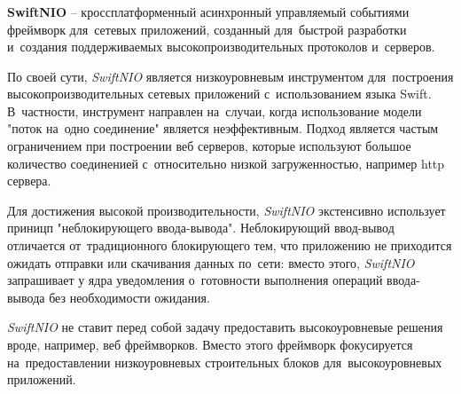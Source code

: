 \subsubsection{}
\label{sec:development:arch:pp:nio}

\textbf{SwiftNIO} -- кроссплатформенный асинхронный управляемый событиями фреймворк для~сетевых приложений, созданный для~быстрой разработки и~создания поддерживаемых высокопроизводительных протоколов и~серверов\cite{nio:github}.

По своей сути, \textit{SwiftNIO} является низкоуровневым инструментом для~построения высокопроизводительных сетевых приложений с~использованием языка Swift. В~частности, инструмент направлен на~случаи, когда использование модели "поток на~одно соединение"  является неэффективным. Подход является частым ограничением при построении веб серверов, которые используют большое количество соединенией с~относительно низкой загруженностью, например \gls{http} сервера.

Для достижения высокой производительности, \textit{SwiftNIO} экстенсивно использует приницп "неблокирующего ввода-вывода". Неблокирующий ввод-вывод отличается от~традиционного блокирующего тем, что приложению не приходится ожидать отправки или скачивания данных по~сети: вместо этого, \textit{SwiftNIO} запрашивает у ядра уведомления о~готовности выполнения операций ввода-вывода без необходимости ожидания.

\textit{SwiftNIO} не ставит перед собой задачу предоставить высокоуровневые решения вроде, например, веб фреймворков. Вместо этого фреймворк фокусируется на~предоставлении низкоуровневых строительных блоков для~высокоуровневых приложений.